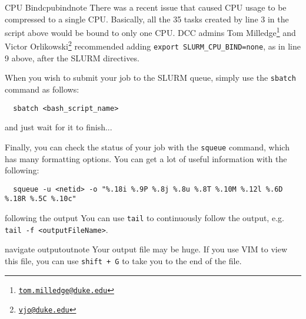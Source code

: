 \documentclass[class=Report, crop=false]{standalone}
\begin{document}
\begin{note}{CPU Bind}{cpubindnote}
  There was a recent issue that caused CPU usage to be compressed to a single CPU. Basically, all the 35 tasks created by line 3 in the script above would be bound to only one CPU. DCC admins Tom Milledge\footnote{\texttt{\href{mailto:tom.milledge@duke.edu}{tom.milledge@duke.edu}}} and Victor Orlikowski\footnote{\texttt{\href{mailto:vjo@duke.edu}{vjo@duke.edu}}} recommended adding \texttt{export SLURM_CPU_BIND=none}, as in line 9 above, after the SLURM directives.
\end{note}


When you wish to submit your job to the SLURM queue, simply use the \texttt{sbatch} command as follows:

\begin{verbatim}
  sbatch <bash_script_name>
\end{verbatim}

\noindent and just wait for it to finish...

Finally, you can check the status of your job with the \texttt{squeue} command, which has many formatting options. You can get a lot of useful information with the following:

\begin{verbatim}
  squeue -u <netid> -o "%.18i %.9P %.8j %.8u %.8T %.10M %.12l %.6D %.18R %.5C %.10c"
\end{verbatim}

\begin{note}{following the output}
  You can use \texttt{tail} to continuously follow the output, e.g.
  \texttt{tail -f <outputFileName>}.
\end{note}

\begin{note}{navigate output}{outnote}
  Your output file may be huge. If you use VIM to view this file, you can use \texttt{shift + G} to take you to the end of the file.
\end{note}
\end{document}
